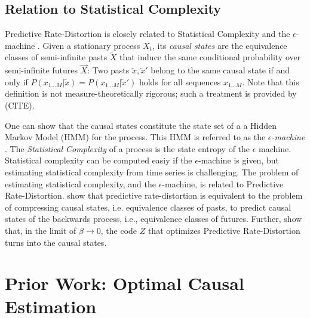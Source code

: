 \documentclass[11pt,letterpaper]{article}
\begin{document}
\subsection{Relation to Statistical Complexity}

Predictive Rate-Distortion is closely related to Statistical Complexity and the $\epsilon$-machine \citep{crutchfield-inferring-1989}.
Given a stationary process $X_t$, its \emph{causal states} are the equivalence classes of semi-infinite pasts $\overleftarrow{X}$ that induce the same conditional probability over semi-infinite futures $\overrightarrow{X}$:
Two pasts $\overleftarrow{x}, \overleftarrow{x}'$ belong to the same causal state if and only if $P(x_{1...M}|\overleftarrow{x}) = P(x_{1...M}|\overleftarrow{x}')$ holds for all sequences $x_{1...M}$.
Note that this definition is not measure-theoretically rigorous; such a treatment is provided by (CITE).

One can show that the causal states constitute the state set of a a Hidden Markov Model (HMM) for the process.
This HMM is referred to as the \emph{$\epsilon$-machine}  \citep{crutchfield-inferring-1989}.
The \emph{Statistical Complexity} of a process is the state entropy of the $\epsilon$ machine.
Statistical complexity can be computed easiy if the $\epsilon$-machine is given, but estimating statistical complexity from time series is challenging.
The problem of estimating statistical complexity, and the $\epsilon$-machine, is related to Predictive Rate-Distortion.
\citep{marzen-predictive-2016} show that predictive rate-distortion is equivalent to the problem of compressing causal states, i.e. equivalence classes of pasts, to predict causal states of the backwards process, i.e., equivalence classes of futures.
Further, \cite{still-optimal-2010} show that, in the limit of $\beta \rightarrow 0$, the code $Z$ that optimizes Predictive Rate-Distortion turns into the causal states.




\section{Prior Work: Optimal Causal Estimation}
\end{document}
